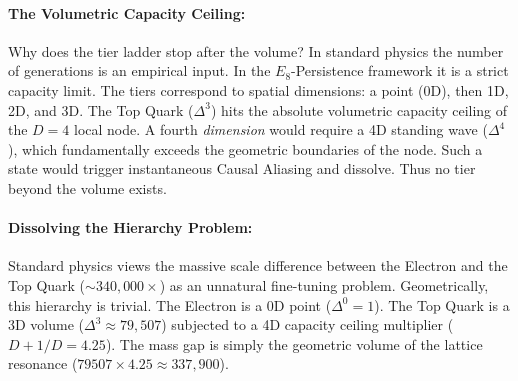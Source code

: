 \paragraph{The Volumetric Capacity Ceiling:}
Why does the tier ladder stop after the volume? In standard physics the number of generations is an empirical input. In the $E_8$-Persistence framework it is a strict capacity limit. The tiers correspond to spatial dimensions: a point (0D), then 1D, 2D, and 3D. The Top Quark ($\Delta^3$) hits the absolute volumetric capacity ceiling of the $D=4$ local node. A fourth \emph{dimension} would require a 4D standing wave ($\Delta^4$), which fundamentally exceeds the geometric boundaries of the node. Such a state would trigger instantaneous Causal Aliasing and dissolve. Thus no tier beyond the volume exists.

\paragraph{Dissolving the Hierarchy Problem:}
Standard physics views the massive scale difference between the Electron and the Top Quark ($\sim 340,000\times$) as an unnatural fine-tuning problem. Geometrically, this hierarchy is trivial. The Electron is a 0D point ($\Delta^0=1$). The Top Quark is a 3D volume ($\Delta^3 \approx 79,507$) subjected to a 4D capacity ceiling multiplier ($D+1/D = 4.25$). The mass gap is simply the geometric volume of the lattice resonance ($79507 \times 4.25 \approx 337,900$).
